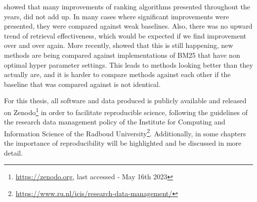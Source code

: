  showed that many improvements of ranking algorithms presented throughout the years, did not add up. In many cases where significant improvements were presented, they were compared against weak baselines. Also, there was no upward trend of retrieval effectiveness, which would be expected if we find improvement over and over again. More recently, \citet{weak-baselines} showed that this is still happening, new methods are being compared against implementations of BM25 that have non optimal hyper parameter settings. This leads to methods looking better than they actually are, and it is harder to compare methods against each other if the baseline that was compared against is not identical.

For this thesis, all software and data produced is publicly available and released on Zenodo\footnote{\url{https://zenodo.org}, last accessed - May 16th 2023} in order to facilitate reproducible science, following the guidelines of the research data management policy of the Institute for Computing and Information Science of the Radboud University\footnote{\url{https://www.ru.nl/icis/research-data-management/}}. Additionally, in some chapters the importance of reproducibility will be highlighted and be discussed in more detail.  